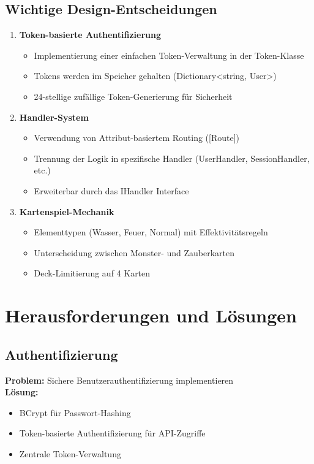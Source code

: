 \documentclass{article}
\begin{document}
\subsection{Wichtige Design-Entscheidungen}
\begin{enumerate}
    \item \textbf{Token-basierte Authentifizierung}
    \begin{itemize}
        \item Implementierung einer einfachen Token-Verwaltung in der Token-Klasse
        \item Tokens werden im Speicher gehalten (Dictionary<string, User>)
        \item 24-stellige zufällige Token-Generierung für Sicherheit
    \end{itemize}
    
    \item \textbf{Handler-System}
    \begin{itemize}
        \item Verwendung von Attribut-basiertem Routing ([Route])
        \item Trennung der Logik in spezifische Handler (UserHandler, SessionHandler, etc.)
        \item Erweiterbar durch das IHandler Interface
    \end{itemize}
    
    \item \textbf{Kartenspiel-Mechanik}
    \begin{itemize}
        \item Elementtypen (Wasser, Feuer, Normal) mit Effektivitätsregeln
        \item Unterscheidung zwischen Monster- und Zauberkarten
        \item Deck-Limitierung auf 4 Karten
    \end{itemize}
\end{enumerate}

\section{Herausforderungen und Lösungen}

\subsection{Authentifizierung}
\textbf{Problem:} Sichere Benutzerauthentifizierung implementieren\\
\textbf{Lösung:} 
\begin{itemize}
    \item BCrypt für Passwort-Hashing
    \item Token-basierte Authentifizierung für API-Zugriffe
    \item Zentrale Token-Verwaltung
\end{itemize}
\end{document}
